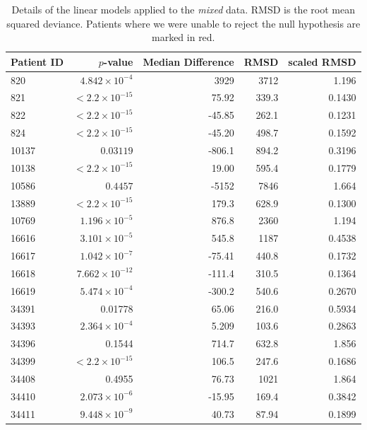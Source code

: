 \documentclass[12pt]{article}
\newcommand{\badpat}[1]{\rowcolor{red}#1}
\begin{document}
\begin{table}[!ht]
\def\arraystretch{1.3}%
\begin{center}
\begin{tabular}{lrrrr} 
Patient ID & $p$-value & Median Difference & RMSD & scaled RMSD \\ 
\hline
820 & $4.842 \times 10^{-4}$ & 3929 & 3712 & 1.196 \\
821 & $< 2.2 \times 10^{-15}$ &75.92 & 339.3 & 0.1430 \\
822 & $< 2.2 \times 10^{-15}$ & -45.85 & 262.1 & 0.1231 \\
824 & $< 2.2 \times 10^{-15}$ & -45.20 & 498.7 & 0.1592 \\
\badpat{10137 & $0.03119$ & -806.1 & 894.2 & 0.3196} \\
10138 & $< 2.2 \times 10^{-15}$ & 19.00 & 595.4 & 0.1779 \\
\badpat{10586 & $0.4457$ & -5152 & 7846 & 1.664} \\
13889 & $< 2.2 \times 10^{-15}$ & 179.3 & 628.9 & 0.1300 \\
10769 & $1.196 \times 10^{-5}$ & 876.8 & 2360 & 1.194 \\
16616 & $3.101 \times 10^{-5}$ & 545.8 & 1187 & 0.4538 \\
16617 & $1.042 \times 10^{-7}$ & -75.41 & 440.8 & 0.1732 \\
16618 & $7.662 \times 10^{-12}$ & -111.4 & 310.5 & 0.1364 \\
16619 & $5.474 \times 10^{-4}$ & -300.2 & 540.6 & 0.2670 \\
\badpat{34391 & 0.01778 & 65.06 & 216.0 & 0.5934} \\
34393 & $2.364 \times 10^{-4}$ & 5.209 & 103.6 & 0.2863 \\
\badpat{34396 & 0.1544 & 714.7 & 632.8 & 1.856} \\
34399 & $< 2.2 \times 10^{-15}$ & 106.5 & 247.6 & 0.1686 \\
\badpat{34408 & 0.4955 & 76.73 & 1021 & 1.864} \\
34410 & $2.073 \times 10^{-6}$ & -15.95 & 169.4 & 0.3842 \\
34411 & $9.448 \times 10^{-9}$ & 40.73 & 87.94 & 0.1899 \\
\hline
\end{tabular}
\end{center}
  \caption{Details of the linear models applied to the \emph{mixed} data. RMSD is the root mean squared deviance. Patients where we were unable to reject the null hypothesis are marked in red.
   }\label{tab:patientserror} 
\end{table}
\end{document}
